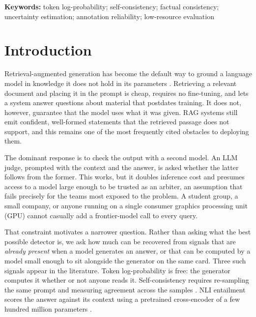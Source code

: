 \documentclass[11pt,a4paper]{article}
\begin{document}
\vspace{0.5em}
\noindent\textbf{Keywords:} token log-probability; self-consistency; factual
consistency; uncertainty estimation; annotation reliability; low-resource
evaluation

\vspace{1em}

\section{Introduction}

Retrieval-augmented generation has become the default way to ground a language
model in knowledge it does not hold in its parameters
\cite{lewis2020retrieval}. Retrieving a relevant document and placing it in the
prompt is cheap, requires no fine-tuning, and lets a system answer questions
about material that postdates training. It does not, however, guarantee that the
model uses what it was given. RAG systems still emit confident, well-formed
statements that the retrieved passage does not support, and this remains one of
the most frequently cited obstacles to deploying them.

The dominant response is to check the output with a second model. An LLM judge,
prompted with the context and the answer, is asked whether the latter follows
from the former. This works, but it doubles inference cost and presumes access
to a model large enough to be trusted as an arbiter, an assumption that fails
precisely for the teams most exposed to the problem. A student group, a small
company, or anyone running on a single consumer graphics processing unit (GPU)
cannot casually add a frontier-model call to every query.

That constraint motivates a narrower question. Rather than asking what the best
possible detector is, we ask how much can be recovered from signals that are
\emph{already present} when a model generates an answer, or that can be computed
by a model small enough to sit alongside the generator on the same card. Three
such signals appear in the literature. Token log-probability is free: the
generator computes it whether or not anyone reads it. Self-consistency requires
re-sampling the same prompt and measuring agreement across the samples
\cite{manakul2023selfcheckgpt}. NLI entailment scores the answer against its
context using a pretrained cross-encoder of a few hundred million parameters
\cite{laban2022summac}.
\end{document}
